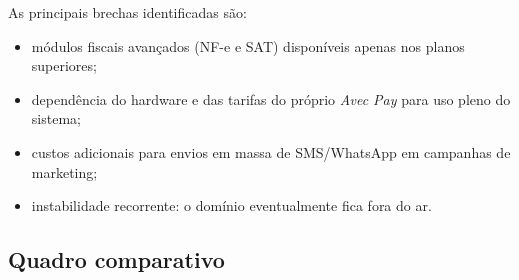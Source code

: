 As principais brechas identificadas são:
\begin{itemize}
	\item módulos fiscais avançados (NF-e e SAT) disponíveis apenas nos planos superiores;
	\item dependência do hardware e das tarifas do próprio \emph{Avec Pay} para uso pleno do sistema;
	\item custos adicionais para envios em massa de SMS/WhatsApp em campanhas de marketing;
	\item instabilidade recorrente: o domínio eventualmente fica fora do ar.
\end{itemize}


\subsection{Quadro comparativo}

